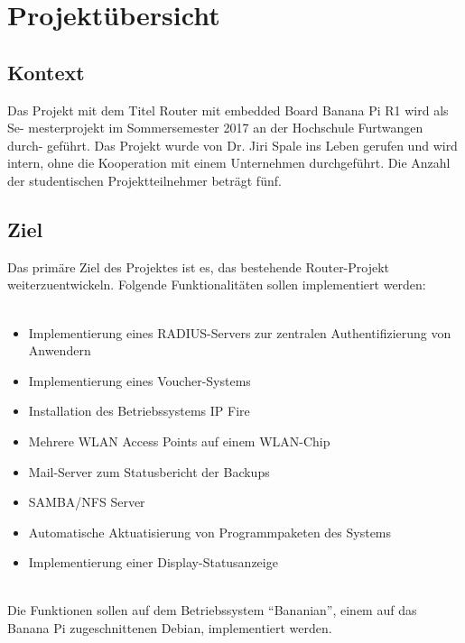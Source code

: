 \chapter{Projektübersicht}

\section{Kontext}
Das Projekt mit dem Titel Router mit embedded Board Banana Pi R1 wird als Se-
mesterprojekt im Sommersemester 2017 an der Hochschule Furtwangen durch-
geführt. Das Projekt wurde von Dr. Jiri Spale ins Leben gerufen und wird
intern, ohne die Kooperation mit einem Unternehmen durchgeführt. Die Anzahl der studentischen Projektteilnehmer beträgt fünf.

\section{Ziel}
Das primäre Ziel des Projektes ist es, das bestehende Router-Projekt weiterzuentwickeln. Folgende Funktionalitäten sollen implementiert werden:\\
~\\
\begin{itemize}
\item Implementierung eines RADIUS-Servers zur zentralen Authentifizierung von Anwendern
\item Implementierung eines Voucher-Systems
\item Installation des Betriebssystems IP Fire
\item Mehrere WLAN Access Points auf einem WLAN-Chip
\item Mail-Server zum Statusbericht der Backups
\item SAMBA/NFS Server
\item Automatische Aktuatisierung von Programmpaketen des Systems
\item Implementierung einer Display-Statusanzeige
\end{itemize}
~\\
Die Funktionen sollen auf dem Betriebssystem “Bananian”, einem auf das Banana Pi zugeschnittenen Debian, implementiert werden.
